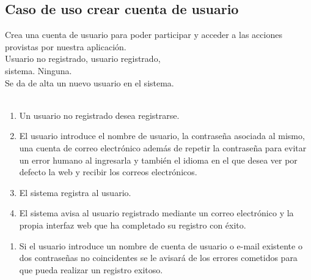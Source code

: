 \subsection{Caso de uso crear cuenta de usuario}
 Crea una cuenta de usuario para poder
participar y acceder a las acciones provistas por nuestra aplicación.\\
 Usuario no registrado, usuario registrado,\\
sistema.
 Ninguna. \\
 Se da de alta un nuevo usuario en el
sistema. \\
\\
\begin{enumerate}
\item Un usuario no registrado desea registrarse.
\item El usuario introduce el nombre de usuario, la contraseña asociada al
  mismo, una cuenta de correo electrónico además de repetir la contraseña para
  evitar un error humano al ingresarla y también el idioma en el que desea ver
  por defecto la web y recibir los correos electrónicos.
\item El sistema registra al usuario.
\item El sistema avisa al usuario registrado mediante un correo electrónico y la
  propia interfaz web que ha completado su registro con éxito.
\end{enumerate}
\begin{enumerate}
\item Si el usuario introduce un nombre de cuenta de usuario o e-mail existente
  o dos contraseñas no coincidentes se le avisará de los errores cometidos para
  que pueda realizar un registro exitoso.
\end{enumerate}

